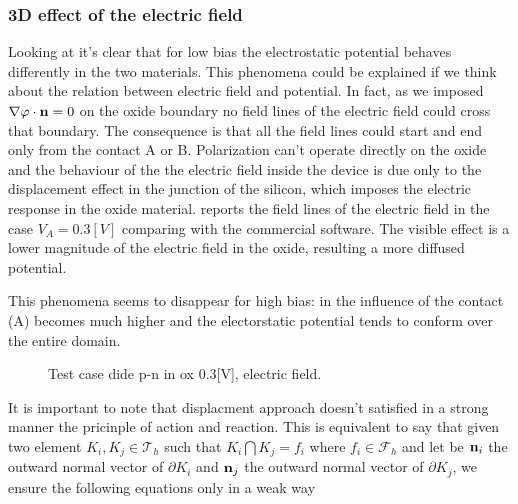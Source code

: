 \clearpage





\subsubsection{3D effect of the electric field}


Looking at  it's clear that for low bias the electrostatic potential behaves differently in the two materials.
This phenomena could be explained if we think about the relation  between electric field and potential.
In fact, as we imposed $\nabla \varphi \cdot \mathbf{n}=0$ on the oxide boundary no field lines of the electric field could cross that boundary. The consequence is that all the field lines could start and end only from the contact A or B.
Polarization can't operate directly on the oxide and the behaviour of the the electric field inside the device is due only to the displacement effect in the junction of the silicon, which imposes the electric response in the oxide material.  reports the field lines of the electric field in the case $V_A=0.3[V]$ comparing with the commercial software. The visible effect is a lower magnitude of the electric field in the oxide, resulting a more diffused potential.

This phenomena seems to disappear for high bias: in  the influence of the contact (A) becomes much higher and the electorstatic potential tends to conform over the entire domain.



\begin{figure}[!h]
\centering
{}
\hspace{1.5cm}
\caption{Test case dide p-n in ox 0.3[V], electric field.}
\label{fig: electric field diode}
\end{figure}






It is important to note that displacment approach doesn't satisfied  in a strong manner the pricinple of action and reaction.
This is equivalent to say that given two element $K_i,K_j\in \mathcal{T}_h$ such that $K_i \bigcap K_j = f_i$ where $f_i \in \mathcal{F}_h$ and let be  $\mathbf{n}_{i}$ the outward normal vector of $\partial K_i$ and $\mathbf{n}_{j}$ the outward normal vector of $\partial K_j$,  we ensure the following equations only in a weak way

